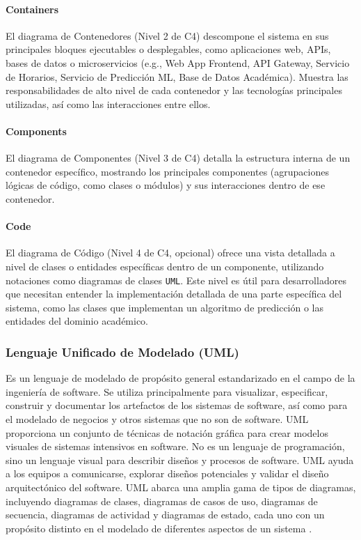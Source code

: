 \paragraph{Containers}
El diagrama de Contenedores (Nivel 2 de C4) descompone el sistema en sus principales bloques ejecutables o desplegables, como aplicaciones web, APIs, bases de datos o microservicios (e.g., Web App Frontend, API Gateway, Servicio de Horarios, Servicio de Predicción ML, Base de Datos Académica).
Muestra las responsabilidades de alto nivel de cada contenedor y las tecnologías principales utilizadas, así como las interacciones entre ellos.

\paragraph{Components}
El diagrama de Componentes (Nivel 3 de C4) detalla la estructura interna de un contenedor específico, mostrando los principales componentes (agrupaciones lógicas de código, como clases o módulos) y sus interacciones dentro de ese contenedor.

\paragraph{Code}
El diagrama de Código (Nivel 4 de C4, opcional) ofrece una vista detallada a nivel de clases o entidades específicas dentro de un componente, utilizando notaciones como diagramas de clases \texttt{UML}.
Este nivel es útil para desarrolladores que necesitan entender la implementación detallada de una parte específica del sistema, como las clases que implementan un algoritmo de predicción o las entidades del dominio académico.

\subsubsection{Lenguaje Unificado de Modelado (UML)}
Es un lenguaje de modelado de propósito general estandarizado en el campo de la ingeniería de software.
Se utiliza principalmente para visualizar, especificar, construir y documentar los artefactos de los sistemas de software, así como para el modelado de negocios y otros sistemas que no son de software.
UML proporciona un conjunto de técnicas de notación gráfica para crear modelos visuales de sistemas intensivos en software.
No es un lenguaje de programación, sino un lenguaje visual para describir diseños y procesos de software.
UML ayuda a los equipos a comunicarse, explorar diseños potenciales y validar el diseño arquitectónico del software.
UML abarca una amplia gama de tipos de diagramas, incluyendo diagramas de clases, diagramas de casos de uso, diagramas de secuencia, diagramas de actividad y diagramas de estado, cada uno con un propósito distinto en el modelado de diferentes aspectos de un sistema \cite{OMG2017, Fowler2003}.
